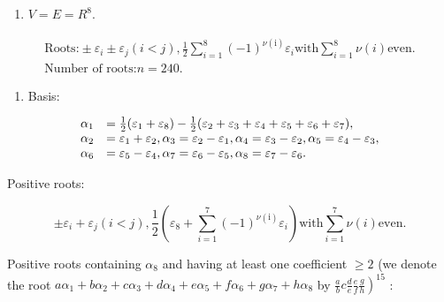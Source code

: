 
\begin{enumerate}
\def\labelenumi{(\Roman{enumi})}
\tightlist
\item
  \(V = E = R^{8}.\)
\end{enumerate}

\[
\begin{array}{l} \text {Roots:} \pm \varepsilon_ {i} \pm \varepsilon_ {j} (i <   j), \frac {1}{2} \sum_ {i = 1} ^ {8} (- 1) ^ {\nu (\mathrm{i})} \varepsilon_ {i} \text {with} \sum_ {i = 1} ^ {8} \nu (i) \text {even.} \\ \text {Number of roots:} n = 240. \end{array}
\]

\begin{enumerate}
\def\labelenumi{(\Roman{enumi})}
\setcounter{enumi}{1}
\tightlist
\item
  Basis:
\end{enumerate}

\[
\begin{array}{r l} \alpha_ {1} & = \frac {1}{2} (\varepsilon_ {1} + \varepsilon_ {8}) - \frac {1}{2} (\varepsilon_ {2} + \varepsilon_ {3} + \varepsilon_ {4} + \varepsilon_ {5} + \varepsilon_ {6} + \varepsilon_ {7}), \\ \alpha_ {2} & = \varepsilon_ {1} + \varepsilon_ {2}, \alpha_ {3} = \varepsilon_ {2} - \varepsilon_ {1}, \alpha_ {4} = \varepsilon_ {3} - \varepsilon_ {2}, \alpha_ {5} = \varepsilon_ {4} - \varepsilon_ {3}, \\ \alpha_ {6} & = \varepsilon_ {5} - \varepsilon_ {4}, \alpha_ {7} = \varepsilon_ {6} - \varepsilon_ {5}, \alpha_ {8} = \varepsilon_ {7} - \varepsilon_ {6}. \end{array}
\]

Positive roots:

\[
\pm \varepsilon_ {i} + \varepsilon_ {j} (i <   j), \frac {1}{2} (\varepsilon_ {8} + \sum_ {i = 1} ^ {7} (- 1) ^ {\nu (\mathrm{i})} \varepsilon_ {i}) \text {with} \sum_ {i = 1} ^ {7} \nu (i) \text {even}.
\]

Positive roots containing \(\alpha_{8}\) and having at least one coefficient \(\geqslant 2\) (we denote the root \(a\alpha_{1} + b\alpha_{2} + c\alpha_{3} + d\alpha_{4} + e\alpha_{5} + f\alpha_{6} + g\alpha_{7} + h\alpha_{8}\) by \(\left.\frac{a}{b}c\frac{d}{e}\frac{e}{f}\frac{g}{h}\right)^{15}\) :

